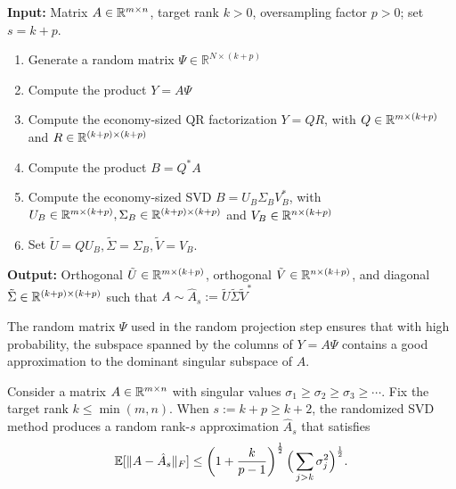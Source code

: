 \begin{algorithm}
\caption{Randomized SVD}
\label{alg:RandSVD}
\textbf{Input:} Matrix  $A \in\mathbb{R}^{m\times n}$, target rank $k>0$, oversampling factor $p>0$; set $s=k+p$.
\begin{enumerate}
\item Generate a random matrix $\Psi \in \mathbb{R}^{N \times (k+p)}$ 
\item  Compute the product $Y = A \Psi$ 
\item Compute the economy-sized QR factorization $Y = Q R$, with $Q \in\mathbb{R}^{m\times (k+p)}$ and  $R \in\mathbb{R}^{(k+p)\times (k+p)}$ 
\item Compute the product  $B = Q^{\ast} A$ 
\item Compute the economy-sized SVD  $B =  U_B \Sigma_B V_B^{\ast}$, with $U_B \in\mathbb{R}^{m\times (k+p)}, \Sigma_B \in\mathbb{R}^{(k+p)\times (k+p)}$ and  $V_B \in\mathbb{R}^{n \times (k+p)}$ 
\item Set $\tilde{U} = Q U_B, \tilde{\Sigma} = \Sigma_B, \tilde{V} = V_B.$ 
\end{enumerate}
\textbf{Output:} Orthogonal $\tilde{U} \in \mathbb{R}^{m \times (k+p)}$, orthogonal $\tilde{V} \in \mathbb{R}^{n \times (k+p)}$, and diagonal $\tilde{\Sigma} \in  \mathbb{R}^{(k+p) \times (k+p)}$ 
such that $A \sim \hat{A}_s:= \tilde{U} \tilde{\Sigma} \tilde{V}^{\ast}$ 

\end{algorithm}


The random matrix $ \Psi $ used in the random projection step ensures that with high probability, the subspace spanned by the columns of $ Y = A \Psi $ contains a good approximation to the dominant singular subspace of $ A $. 



\begin{theorem}\label{th:randSVD}
Consider a matrix $A \in \mathbb{R}^{m \times n}$ with singular values $\sigma_1 \ge \sigma_2 \ge \sigma_3 \ge \cdots$. Fix the target rank  $k \le \min(m,n)$. When $s :=k+p \ge k+2$, the randomized SVD method  produces a random rank-$s$
approximation $\hat{A}_s$ that satisfies
\begin{equation}
\label{randSVDbound}
\mathbb{E}[ \|A - \hat{A}_s \|_F ] \le \left(1 + \frac{k}{p-1}\right)^\frac{1}{2} \Big( \sum_{j > k}\sigma_{j}^2\Big)^\frac{1}{2}.
\end{equation}
\end{theorem}

